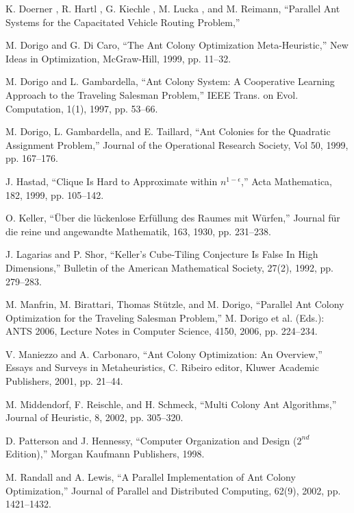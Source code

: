 \documentclass[11pt]{article}
\begin{document}
\begin{thebibliography}{99}
K. Doerner , R. Hartl , G. Kiechle , M. Lucka , and M. Reimann, ``Parallel Ant Systems for the Capacitated Vehicle Routing Problem,''


M. Dorigo and G. Di Caro, ``The Ant Colony Optimization Meta-Heuristic,'' New Ideas in Optimization, McGraw-Hill, 1999, pp. 11--32.


M. Dorigo and L. Gambardella, ``Ant Colony System: A Cooperative Learning Approach to the Traveling Salesman Problem,'' IEEE Trans. on Evol. Computation, 1(1), 1997, pp. 53--66.

M. Dorigo, L. Gambardella, and E. Taillard, ``Ant Colonies for the Quadratic Assignment Problem,'' Journal of the Operational Research Society, Vol 50, 1999, pp. 167--176.


J. Hastad, ``Clique Is Hard to Approximate within $n^{1 - \epsilon}$,'' Acta Mathematica, 182, 1999, pp. 105--142.


O. Keller, ``\"Uber die l\"uckenlose Erf\"ullung des Raumes mit W\"urfen,'' Journal f\"ur die reine und angewandte Mathematik, 163,  1930, pp. 231--238.

J. Lagarias and P. Shor, ``Keller's Cube-Tiling Conjecture Is False In High Dimensions,'' Bulletin of the American Mathematical Society, 27(2), 1992, pp. 279--283.


M. Manfrin, M. Birattari, Thomas St\"utzle, and M. Dorigo, ``Parallel Ant Colony Optimization for the Traveling Salesman Problem,'' M. Dorigo et al. (Eds.): ANTS 2006, Lecture Notes in Computer Science, 4150, 2006, pp. 224--234.


V. Maniezzo and A. Carbonaro, ``Ant Colony Optimization: An Overview,'' Essays and Surveys in Metaheuristics, C. Ribeiro editor, Kluwer Academic Publishers, 2001, pp. 21--44.



M. Middendorf, F. Reischle, and H. Schmeck, ``Multi Colony Ant Algorithms,'' Journal of Heuristic, 8, 2002, pp. 305--320.


D. Patterson and J. Hennessy, ``Computer Organization and Design ($2^{nd}$ Edition),'' Morgan Kaufmann Publishers, 1998.


M. Randall and A. Lewis, ``A Parallel Implementation of Ant Colony Optimization,'' Journal of Parallel and Distributed Computing, 62(9), 2002, pp. 1421--1432.


\end{thebibliography}
\end{document}
